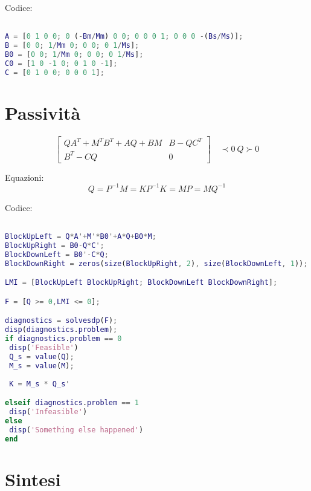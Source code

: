 \documentclass{article}
\begin{document}
Codice:
\begin{lstlisting}[language=Matlab]  % Start your code-block

A = [0 1 0 0; 0 (-Bm/Mm) 0 0; 0 0 0 1; 0 0 0 -(Bs/Ms)];
B = [0 0; 1/Mm 0; 0 0; 0 1/Ms];
B0 = [0 0; 1/Mm 0; 0 0; 0 1/Ms];
C0 = [1 0 -1 0; 0 1 0 -1];
C = [0 1 0 0; 0 0 0 1];

\end{lstlisting}


\section{Passività}

\begin{equation*}

\begin{bmatrix} QA^{T} + M^{T}B^{T}+AQ+BM & B-QC^{T} \\ B^{T}-CQ & 0
\end{bmatrix}\quad \prec 0

~

Q \succ 0

\end{equation*}

Equazioni:
\begin{equation*}

Q = P^{-1}

M = KP^{-1}

K = MP = MQ^{-1}

\end{equation*}

Codice:

\begin{lstlisting}[language=Matlab]  % Start your code-block

BlockUpLeft = Q*A'+M'*B0'+A*Q+B0*M;
BlockUpRight = B0-Q*C';
BlockDownLeft = B0'-C*Q;
BlockDownRight = zeros(size(BlockUpRight, 2), size(BlockDownLeft, 1));

LMI = [BlockUpLeft BlockUpRight; BlockDownLeft BlockDownRight];

F = [Q >= 0,LMI <= 0];

diagnostics = solvesdp(F);
disp(diagnostics.problem);
if diagnostics.problem == 0
 disp('Feasible')
 Q_s = value(Q);
 M_s = value(M);
 
 K = M_s * Q_s'

elseif diagnostics.problem == 1
 disp('Infeasible')
else
 disp('Something else happened')
end
\end{lstlisting}


\section{Sintesi}
\end{document}
